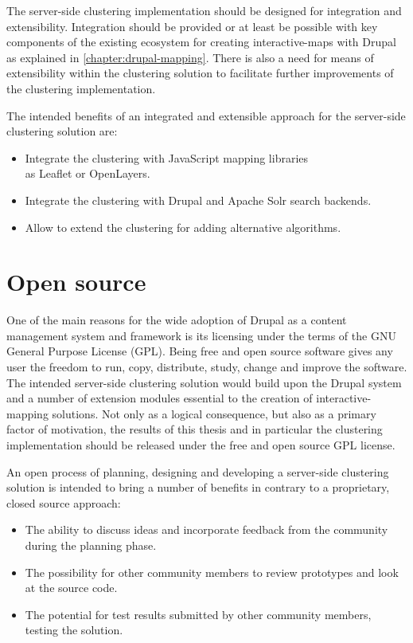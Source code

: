 The server-side clustering implementation should be designed for integration and extensibility. Integration should be provided or at least be possible with key components of the existing ecosystem for creating interactive-maps with Drupal as explained in \ref{chapter:drupal-mapping}. There is also a need for means of extensibility within the clustering solution to facilitate further improvements of the clustering implementation.

The intended benefits of an integrated and extensible approach for the server-side clustering solution are:

\begin{itemize}

\item Integrate the clustering with JavaScript mapping libraries\\ as Leaflet or OpenLayers.

\item Integrate the clustering with Drupal and Apache Solr search backends.

\item Allow to extend the clustering for adding alternative algorithms. 

\end{itemize}


\section{Open source}
\label{chapter:open-source}

One of the main reasons for the wide adoption of Drupal as a content management system and framework is its licensing under the terms of the GNU General Purpose License (GPL). Being free and open source software gives any user the freedom to run, copy, distribute, study, change and improve the software. The intended server-side clustering solution would build upon the Drupal system and a number of extension modules essential to the creation of interactive-mapping solutions. Not only as a logical consequence, but also as a primary factor of motivation, the results of this thesis and in particular the clustering implementation should be released under the free and open source GPL license.

An open process of planning, designing and developing a server-side clustering solution is intended to bring a number of benefits in contrary to a proprietary, closed source approach:

\begin{itemize}

\item The ability to discuss ideas and incorporate feedback from the community during the planning phase.

\item The possibility for other community members to review prototypes and look at the source code.

\item The potential for test results submitted by other community members, testing the solution. 

\end{itemize}


